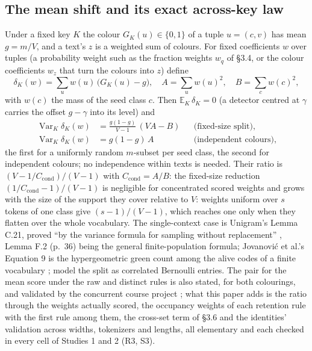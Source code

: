 \documentclass[11pt,letterpaper]{article}
\begin{document}
\hypertarget{the-mean-shift-and-its-exact-across-key-law}{%
\subsection{The mean shift and its exact across-key law}\label{the-mean-shift-and-its-exact-across-key-law}}

Under a fixed key \(K\) the colour \(G_K(u) \in \{0, 1\}\) of a tuple \(u = (c, v)\) has mean \(g = m/V\), and a text's \(z\) is a weighted sum of colours. For fixed coefficients \(w\) over tuples (a probability weight such as the fraction weights \(w_q\) of \S{}3.4, or the colour coefficients \(w_z\) that turn the colours into \(z\)) define \[\delta_K(w) = \sum_u w(u)\,\bigl(G_K(u) - g\bigr), \quad A = \sum_u w(u)^2, \quad B = \sum_c w(c)^2,\] with \(w(c)\) the mass of the seed class \(c\). Then \(\mathbb{E}_K\,\delta_K = 0\) (a detector centred at \(\gamma\) carries the offset \(g - \gamma\) into its level) and \[\begin{aligned} \operatorname{Var}_K \delta_K(w) &= \frac{g(1-g)}{V-1}\,(V A - B) && \text{(fixed-size split)},\\ \operatorname{Var}_K \delta_K(w) &= g(1-g)\,A && \text{(independent colours)}, \end{aligned}\] the first for a uniformly random \(m\)-subset per seed class, the second for independent colours; no independence within texts is needed. Their ratio is \((V - 1/C_{\mathrm{cond}})/(V - 1)\) with \(C_{\mathrm{cond}} = A/B\): the fixed-size reduction \((1/C_{\mathrm{cond}} - 1)/(V - 1)\) is negligible for concentrated scored weights and grows with the size of the support they cover relative to \(V\): weights uniform over \(s\) tokens of one class give \((s - 1)/(V - 1)\), which reaches one only when they flatten over the whole vocabulary. The single-context case is Unigram's Lemma C.21, proved ``by the variance formula for sampling without replacement'' \citep[pp.~31--32]{zhao2024unigram}, Lemma F.2 (p.~36) being the general finite-population formula; Jovanovi\'c et al.'s Equation 9 is the hypergeometric green count among the alive codes of a finite vocabulary \citep{jovanovic2025image}; \citet{gloaguen2026unified} model the split as correlated Bernoulli entries. The pair for the mean score under the raw and distinct rules is also stated, for both colourings, and validated by the concurrent course project \citep{yukhimchuk2026keylottery}; what this paper adds is the ratio through the weights actually scored, the occupancy weights of each retention rule with the first rule among them, the cross-set term of \S{}3.6 and the identities' validation across widths, tokenizers and lengths, all elementary and each checked in every cell of Studies 1 and 2 (R3, S3).
\end{document}
